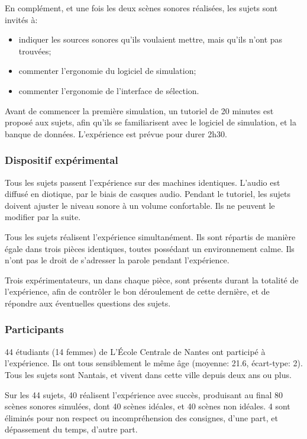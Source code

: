 \documentclass[twoside,twocolumn]{article}
\begin{document}
En complément, et une fois les deux scènes sonores réalisées, les sujets sont invités à:

\begin{itemize}
\item indiquer les sources sonores qu'ils voulaient mettre, mais qu'ils n'ont pas trouvées;
\item commenter l’ergonomie du logiciel de simulation;
\item commenter l’ergonomie de l'interface de sélection.
\end{itemize}

Avant de commencer la première simulation, un tutoriel de 20 minutes est proposé aux sujets, afin qu'ils se familiarisent avec le logiciel de simulation, et la banque de données. L'expérience est prévue pour durer 2h30.

\subsubsection*{Dispositif expérimental}

Tous les sujets passent l'expérience sur des machines identiques. L'audio est diffusé en diotique, par le biais de casques audio. Pendant le tutoriel, les sujets doivent ajuster le niveau sonore à un volume confortable. Ils ne peuvent le modifier par la suite.

Tous les sujets réalisent l'expérience simultanément. Ils sont répartis de manière égale dans trois pièces identiques, toutes possédant un environnement calme. Ils n'ont pas le droit de s'adresser la parole pendant l'expérience.

Trois expérimentateurs, un dans chaque pièce, sont présents durant la totalité de l'expérience, afin de contrôler le bon déroulement de cette dernière, et de répondre aux éventuelles questions des sujets.

\subsubsection*{Participants}

44 étudiants (14 femmes) de L’École Centrale de Nantes ont participé à l'expérience. Ils ont tous sensiblement le même âge (moyenne: 21.6, écart-type: 2). Tous les sujets sont Nantais, et vivent dans cette ville depuis deux ans ou plus.

Sur les 44 sujets, 40 réalisent l'expérience avec succès, produisant au final 80 scènes sonores simulées, dont 40 scènes idéales, et 40 scènes non idéales. 4 sont éliminés pour non respect ou incompréhension des consignes, d'une part, et dépassement du temps, d'autre part.
\end{document}
